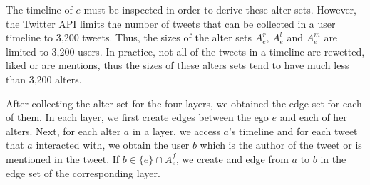 The timeline of $e$ must be inspected in order to derive these alter sets. However, the Twitter API limits the number of tweets that can be collected in a user timeline to 3,200 tweets.  Thus, the sizes of  the alter sets $A_e^r$, $A_e^l$ and $A_e^m$ are limited to 3,200 users. In practice,  not all of the tweets in a timeline are rewetted, liked or are mentions, thus the sizes of these alters sets tend to have much less than 3,200 alters.

After collecting  the alter set for the four layers, we obtained the edge set for each of them. In each layer, we first create edges between the ego $e$ and each of her alters. Next, for each alter $a$ in a layer, we access $a$'s timeline and for each tweet that $a$ interacted with, we obtain the user $b$  which is the author of the tweet or is mentioned in the tweet. If $b \in \{e\}\cap A_e^f$, we create and edge from $a$ to $b$ in the edge set of the corresponding layer.

